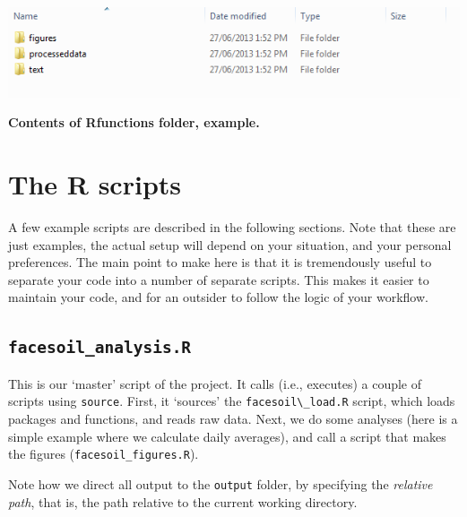 \documentclass[]{book}
\begin{document}
\includegraphics[width=0.7\linewidth]{screenshots/output}

\textbf{Contents of Rfunctions folder, example.}

\hypertarget{the-r-scripts}{%
\section{The R scripts}\label{the-r-scripts}}

A few example scripts are described in the following sections. Note that these are just examples, the actual setup will depend on your situation, and your personal preferences. The main point to make here is that it is tremendously useful to separate your code into a number of separate scripts. This makes it easier to maintain your code, and for an outsider to follow the logic of your workflow.

\hypertarget{facesoil_analysis.r}{%
\subsection{\texorpdfstring{\texttt{facesoil\_analysis.R}}{facesoil\_analysis.R}}\label{facesoil_analysis.r}}

This is our `master' script of the project. It calls (i.e., executes) a couple of scripts using \texttt{source}. First, it `sources' the \texttt{facesoil\textbackslash{}\_load.R} script, which loads packages and functions, and reads raw data. Next, we do some analyses (here is a simple example where we calculate daily averages), and call a script that makes the figures (\texttt{facesoil\_figures.R}).

Note how we direct all output to the \texttt{output} folder, by specifying the \emph{relative path}, that is, the path relative to the current working directory.
\end{document}
